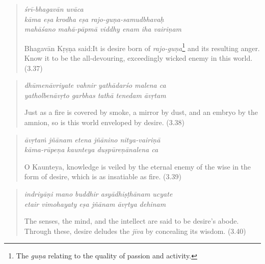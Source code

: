 \documentclass[12pt, twoside, openright]{memoir}
\begin{document}
\par
\begin{verse}
\textit{śrī-bhagavān uvāca} \\
\textit{kāma eṣa krodha eṣa rajo-guṇa-samudbhavaḥ} \\
\textit{mahāśano mahā-pāpmā viddhy enam iha vairiṇam}

\noindent \quad Bhagavān Kṛṣṇa said:\linebreak It is desire born of \textit{rajo-guṇa}\footnote{The \textit{guṇa} relating to the quality of passion and activity.} and its resulting anger. Know it to be the all-devouring, exceedingly wicked enemy in this world. (3.37)
\end{verse}
\par
 


\par
\begin{verse}
\textit{dhūmenāvriyate vahnir yathādarśo malena ca} \\
\textit{yatholbenāvṛto garbhas tathā tenedam āvṛtam}

\noindent Just as a fire is covered by smoke, a mirror by dust, and an embryo by the amnion, so is this world enveloped by desire. (3.38)
\end{verse}
\par



\par
\begin{verse}
\textit{āvṛtaṁ jñānam etena jñānino nitya-vairiṇā} \\
\textit{kāma-rūpeṇa kaunteya duṣpūreṇānalena ca}

\noindent O Kaunteya, knowledge is veiled by the eternal enemy of the wise in the form of desire, which is as insatiable as fire. (3.39)
\end{verse}
\par



\par
\begin{verse}
\textit{indriyāṇi mano buddhir asyādhiṣṭhānam ucyate} \\
\textit{etair vimohayaty eṣa jñānam āvṛtya dehinam}

\noindent The senses, the mind, and the intellect are said to be desire’s abode. Through these, desire deludes the \textit{jīva} by concealing its wisdom. (3.40)
\end{verse}
\par
\end{document}
